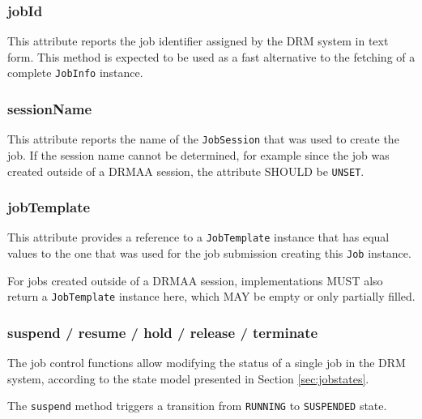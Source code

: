 \documentclass{article}
\newcommand{\h}[1]{\lstinline|#1|}
\newcommand{\rat}[1]{}
\begin{document}
\subsubsection{jobId}

This attribute reports the job identifier assigned by the DRM system in text form. This method is expected to be used as a fast alternative to the fetching of a complete \h{JobInfo} instance.

\subsubsection{sessionName}

This attribute reports the name of the \h{JobSession} that was used to create the job. If the session name cannot be determined, for example since the job was created outside of a DRMAA session, the attribute SHOULD be \h{UNSET}.

\rat{June 29th 2011 conf call decided to return session names instead of session objects. This keeps the consistent approach that instantiated session objects represent a live ``connection'' to the DRMS. Connecting to the referenced session is then a separate explicit step in the application. It also supports better that people create instances from jobs created outside of a DRMAA session.
}

\subsubsection{jobTemplate}

This attribute provides a reference to a \h{JobTemplate} instance that has equal values to the one that was used for the job submission creating this \h{Job} instance.

For jobs created outside of a DRMAA session, implementations MUST also return a \h{JobTemplate} instance here, which MAY be empty or only partially filled.
 
\subsubsection{suspend / resume / hold / release / terminate}
\label{sec:jobcontrolfunctions}

The job control functions allow modifying the status of a single job in the DRM system, according to the state model presented in Section \ref{sec:jobstates}. 

The \h{suspend} method triggers a transition from \h{RUNNING} to \h{SUSPENDED} state. 
\end{document}
